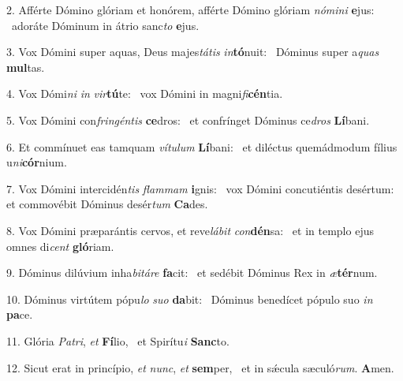 2. Afférte Dómino glóriam et honórem, afférte Dómino glóriam \textit{nó}\textit{mi}\textit{ni} \textbf{e}jus: \ast\  adoráte Dóminum in átrio sanc\textit{to} \textbf{e}jus.\

3. Vox Dómini super aquas, Deus majes\textit{tá}\textit{tis} \textit{in}\textbf{tó}nuit: \ast\  Dóminus super a\textit{quas} \textbf{mul}tas.\

4. Vox Dómi\textit{ni} \textit{in} \textit{vir}\textbf{tú}te: \ast\  vox Dómini in magni\textit{fi}\textbf{cén}tia.\

5. Vox Dómini con\textit{frin}\textit{gén}\textit{tis} \textbf{ce}dros: \ast\  et confrínget Dóminus ce\textit{dros} \textbf{Lí}bani.\

6. Et commínuet eas tamquam \textit{ví}\textit{tu}\textit{lum} \textbf{Lí}bani: \ast\  et diléctus quemádmodum fílius u\textit{ni}\textbf{cór}nium.\

7. Vox Dómini intercidén\textit{tis} \textit{flam}\textit{mam} \textbf{i}gnis: \ast\  vox Dómini concutiéntis desértum: et commovébit Dóminus desér\textit{tum} \textbf{Ca}des.\

8. Vox Dómini præparántis cervos, et reve\textit{lá}\textit{bit} \textit{con}\textbf{dén}sa: \ast\  et in templo ejus omnes di\textit{cent} \textbf{gló}riam.\

9. Dóminus dilúvium inha\textit{bi}\textit{tá}\textit{re} \textbf{fa}cit: \ast\  et sedébit Dóminus Rex in \textit{æ}\textbf{tér}num.\

10. Dóminus virtútem pópu\textit{lo} \textit{su}\textit{o} \textbf{da}bit: \ast\  Dóminus benedícet pópulo suo \textit{in} \textbf{pa}ce.\

11. Glória \textit{Pa}\textit{tri}, \textit{et} \textbf{Fí}lio, \ast\  et Spirítu\textit{i} \textbf{Sanc}to.\

12. Sicut erat in princípio, \textit{et} \textit{nunc}, \textit{et} \textbf{sem}per, \ast\  et in sǽcula sæculó\textit{rum}. \textbf{A}men.\


